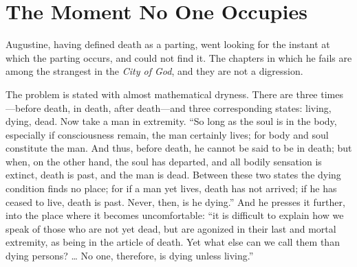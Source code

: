 \section{The Moment No One Occupies}

Augustine, having defined death as a parting, went looking for the instant at which the parting occurs, and could not find it. The chapters in which he fails are among the strangest in the \emph{City of God}, and they are not a digression.

The problem is stated with almost mathematical dryness. There are three times---before death, in death, after death---and three corresponding states: living, dying, dead. Now take a man in extremity. ``So long as the soul is in the body, especially if consciousness remain, the man certainly lives; for body and soul constitute the man. And thus, before death, he cannot be said to be in death; but when, on the other hand, the soul has departed, and all bodily sensation is extinct, death is past, and the man is dead. Between these two states the dying condition finds no place; for if a man yet lives, death has not arrived; if he has ceased to live, death is past. Never, then, is he dying.'' And he presses it further, into the place where it becomes uncomfortable: ``it is difficult to explain how we speak of those who are not yet dead, but are agonized in their last and mortal extremity, as being in the article of death. Yet what else can we call them than dying persons? \ldots{} No one, therefore, is dying unless living.''

